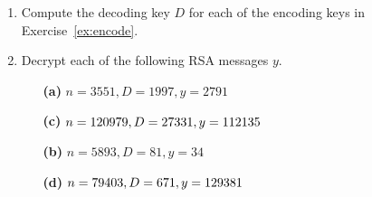 {\begin{enumerate}
\begin{minipage}[t]{4.6in}
\begin{minipage}[t]{2.25in}
\begin{itemize}
 \item[{\bf (b)}]
$n = 2257, E = 47, x = 23$
 
 \item[{\bf (d)}]
$n = 45629, E = 781,\\ x = 231561$
 
\end{itemize}
\end{minipage}
\end{minipage}
 
\vspace{2pt}        %
 
 
 
\bf\item\rm
Compute the decoding key $D$ for each of the encoding keys in
Exercise~\ref{ex:encode}. 
 
 
\bf\item\rm
Decrypt each of the following RSA messages $y$.
 
 
\vspace{3pt}        %
 
\hspace{-7pt}
\begin{minipage}[t]{4.6in}
\noindent
\begin{minipage}[t]{2.25in}
\begin{itemize}
 
 \item[{\bf (a)}]
$n = 3551, D = 1997, y = 2791$
 
 \item[{\bf (c)}]
$n = 120979, D = 27331,\\ y = 112135$
 
\end{itemize}
\end{minipage} \hfill
\begin{minipage}[t]{2.25in}
\begin{itemize}
 
 \item[{\bf (b)}]
$n = 5893, D = 81, y = 34$
 
 \item[{\bf (d)}]
$n = 79403, D = 671,\\ y = 129381$
 
\end{itemize}
\end{minipage}
\end{minipage}
 
\vspace{2pt}        %
 

\end{enumerate}}
